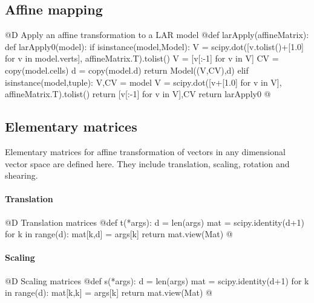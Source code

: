 \documentclass[11pt,oneside]{article}	%
\begin{document}
\subsection{Affine mapping}

@D Apply an affine transformation to a LAR model 
@{def larApply(affineMatrix):
	def larApply0(model):
		if isinstance(model,Model):
			V = scipy.dot([v.tolist()+[1.0] for v in model.verts], affineMatrix.T).tolist()
			V = [v[:-1] for v in V]
			CV = copy(model.cells)
			d = copy(model.d)
			return Model((V,CV),d)
		elif isinstance(model,tuple):
			V,CV = model
			V = scipy.dot([v+[1.0] for v in V], affineMatrix.T).tolist()
			return [v[:-1] for v in V],CV
	return larApply0
@}


\subsection{Elementary matrices}
Elementary matrices for affine transformation of vectors in any dimensional vector space are defined here. They include translation, scaling, rotation and shearing. 

\paragraph{Translation}
@D Translation matrices
@{def t(*args): 
	d = len(args)
	mat = scipy.identity(d+1)
	for k in range(d): 
		mat[k,d] = args[k]
	return mat.view(Mat)
@}
\paragraph{Scaling}
@D Scaling matrices
@{def s(*args): 
	d = len(args)
	mat = scipy.identity(d+1)
	for k in range(d): 
		mat[k,k] = args[k]
	return mat.view(Mat)
@}
\end{document}
